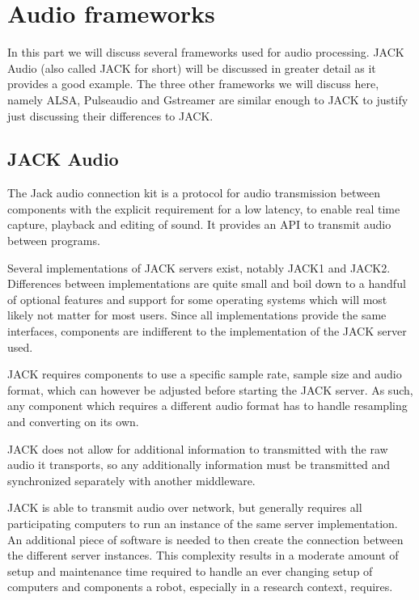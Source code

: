 
\section{Audio frameworks}
In this part we will discuss several frameworks used for audio processing.
JACK Audio (also called JACK for short) will be discussed in greater detail as it provides a good example.
The three other frameworks we will discuss here, namely ALSA, Pulseaudio and Gstreamer are similar enough to JACK to justify just discussing their differences to JACK.


\subsection{JACK Audio}

The Jack audio connection kit \cite{JACK} is a protocol for audio transmission between components with the explicit requirement for a low latency, to enable real time capture, playback and editing of sound. 
It provides an API to transmit audio between programs. 

Several implementations of JACK servers exist, notably JACK1 and JACK2. 
Differences between implementations are quite small and boil down to a handful of optional features and support for some operating systems which will most likely not matter for most users. %
Since all implementations provide the same interfaces, components are indifferent to the implementation of the JACK server used. 

JACK requires components to use a specific sample rate, sample size and audio format, which can however be adjusted before starting the JACK server. 
As such, any component which requires a different audio format has to handle resampling and converting on its own. 

JACK does not allow for additional information to transmitted with the raw audio it transports, so any additionally information must be transmitted and synchronized separately with another middleware. 

JACK is able to transmit audio over network, but generally requires all participating computers to run an instance of the same server implementation. 
An additional piece of software is needed to then create the connection between the different server instances. 
This complexity results in a moderate amount of setup and maintenance time required to handle an ever changing setup of computers and components a robot, especially in a research context, requires.


